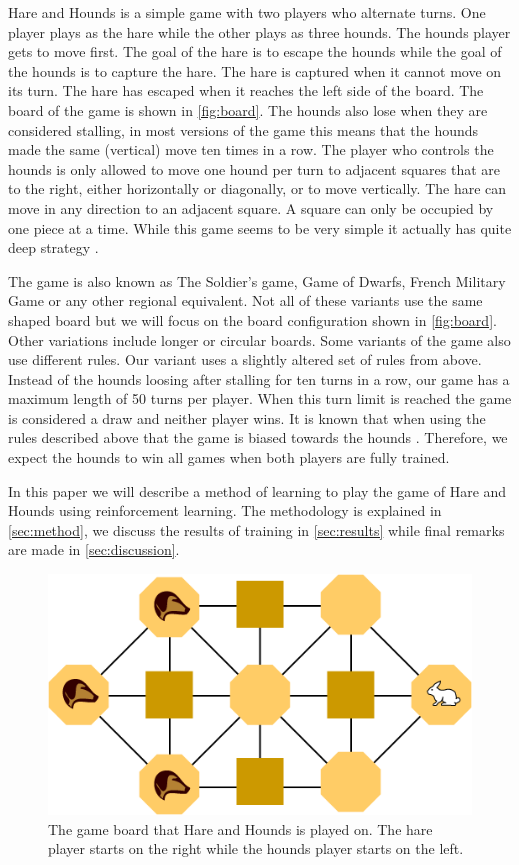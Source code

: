 Hare and Hounds is a simple game with two players who alternate turns. One
player plays as the hare while the other plays as three hounds. The hounds
player gets to move first. The goal of the
hare is to escape the hounds while the goal of the hounds is to capture the
hare. The hare is captured when it cannot move on its turn. The hare has escaped
when it reaches the left side of the board. The board of the game is shown in
\autoref{fig:board}. The hounds also lose when they are considered stalling,
in most versions of the game this means that the hounds made the same
(vertical) move ten times in a row. The player who controls the hounds is only
allowed to move one hound per turn to adjacent squares that are to the right,
either horizontally or diagonally, or to move vertically. The hare can move in
any direction to an adjacent square. A square can only be occupied by one piece
at a time. While this game seems to be very simple it actually has quite deep
strategy \cite{gardner1961second}. 

The game is also known as The Soldier's game, Game of Dwarfs, French
Military Game or any other regional equivalent. Not all of these variants
use the same shaped board but we will focus on the board configuration
shown in \autoref{fig:board}. Other variations include longer or circular
boards.  Some variants of the game also use different rules. Our variant
uses a slightly altered set of rules from above. Instead of the hounds
loosing after stalling for ten turns in a row, our game has a maximum
length of 50 turns per player.  When this turn limit is reached the game is
considered a draw and neither player wins.  It is known that when using the
rules described above that the game is biased towards the
hounds \cite{gardner1961second}. Therefore, we expect the hounds to win all
games when  both players are fully trained. 

In this paper we will describe a method of learning to play the game of Hare
and Hounds using reinforcement learning. The methodology is explained in
\autoref{sec:method}, we discuss the results of training in
\autoref{sec:results} while final remarks are made in \autoref{sec:discussion}.

\begin{figure}[h]
    \centering
    \includegraphics[width=.75\textwidth]{Hare_and_Hounds_board.png}
    \caption{The game board that Hare and Hounds is played on. The hare player
        starts on the right while the hounds player starts on the left.}
    \label{fig:board}
\end{figure}
